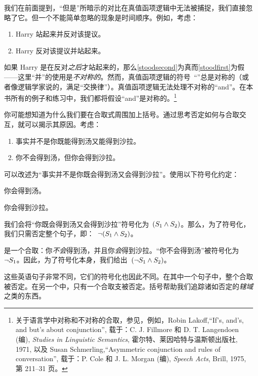 我们在前面提到，“但是”所暗示的对比在真值函项逻辑中无法被捕捉，我们直接忽略了它。但一个不能简单忽略的现象是时间顺序。例如，考虑：


\begin{enumerate}
	\item\label{stoodfirst} Harry 站起来并反对该提议。
	\item\label{stoodsecond} Harry 反对该提议并站起来。
\end{enumerate}


如果 Harry 是在反对\emph{之后}才站起来的，那么\cref*{stoodsecond}为真而\cref*{stoodfirst}为假——这里“并”的使用是\emph{不对称的}。然而，真值函项逻辑的符号~“\eand”总是对称的（或者像逻辑学家说的，满足“交换律”）。真值函项逻辑无法处理不对称的“and”。在本书所有的例子和练习中，我们都将假设“and”是对称的。\footnote{关于语言学中对称和不对称的合取，参见，例如，Robin Lakoff,“If's, and's, and but's about conjunction”, 载于：C. J. Fillmore 和 D. T. Langendoen (编), \textit{Studies in Linguistic Semantics}, 霍尔特、莱因哈特与温斯顿出版社, 1971, 以及 Susan Schmerling,“Asymmetric conjunction and rules of conversation”, 载于：P. Cole 和 J. L. Morgan (编), \textit{Speech Acts}, Brill, 1975, 第 211--31 页。}

你可能想知道为什么我们要在合取式周围加上括号。通过思考否定如何与合取交互，就可以揭示其原因。考虑：


\begin{enumerate}
		\item\label{negcon1} 事实并不是你既能得到汤又能得到沙拉。
		\item\label{negcon2} 你不会得到汤，但你会得到沙拉。
	\end{enumerate}


可以改述为“事实并不是你既会得到汤又会得到沙拉”。使用以下符号化约定：


\begin{ekey}
		\item[\ensuremath{S_1}] 你会得到汤。
		\item[\ensuremath{S_2}] 你会得到沙拉。
	\end{ekey}


我们会将“你既会得到汤又会得到沙拉”符号化为~$(S_1 \wedge S_2)$。那么，为了符号化，我们只需否定整个句子，即：~$\neg (S_1 \wedge S_2)$。

是一个合取：你\emph{不会}得到汤，并且你\emph{会}得到沙拉。“你不会得到汤”被符号化为~$\neg S_1$。因此，为了符号化本身，我们给出~$(\neg S_1 \wedge S_2)$。

这些英语句子非常不同，它们的符号化也因此不同。在其中一个句子中，整个合取被否定。在另一个中，只有一个合取支被否定。括号帮助我们追踪诸如否定的\emph{辖域}之类的东西。

